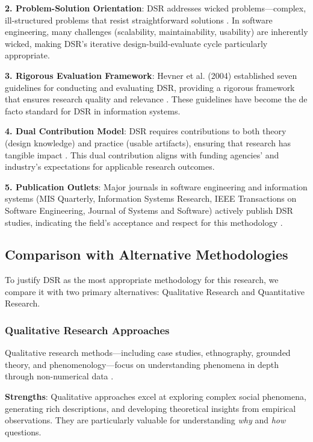 \textbf{2. Problem-Solution Orientation}: DSR addresses wicked problems---complex, ill-structured problems that resist straightforward solutions \cite{rittel1973dilemmas}. In software engineering, many challenges (scalability, maintainability, usability) are inherently wicked, making DSR's iterative design-build-evaluate cycle particularly appropriate.

\textbf{3. Rigorous Evaluation Framework}: Hevner et al. (2004) established seven guidelines for conducting and evaluating DSR, providing a rigorous framework that ensures research quality and relevance \cite{hevner2004design}. These guidelines have become the de facto standard for DSR in information systems.

\textbf{4. Dual Contribution Model}: DSR requires contributions to both theory (design knowledge) and practice (usable artifacts), ensuring that research has tangible impact \cite{venable2016design}. This dual contribution aligns with funding agencies' and industry's expectations for applicable research outcomes.

\textbf{5. Publication Outlets}: Major journals in software engineering and information systems (MIS Quarterly, Information Systems Research, IEEE Transactions on Software Engineering, Journal of Systems and Software) actively publish DSR studies, indicating the field's acceptance and respect for this methodology \cite{straub2015editor}.

\subsection{Comparison with Alternative Methodologies}

To justify DSR as the most appropriate methodology for this research, we compare it with two primary alternatives: Qualitative Research and Quantitative Research.

\subsubsection{Qualitative Research Approaches}

Qualitative research methods---including case studies, ethnography, grounded theory, and phenomenology---focus on understanding phenomena in depth through non-numerical data \cite{myers2019qualitative}.

\textbf{Strengths}: Qualitative approaches excel at exploring complex social phenomena, generating rich descriptions, and developing theoretical insights from empirical observations. They are particularly valuable for understanding \textit{why} and \textit{how} questions.

